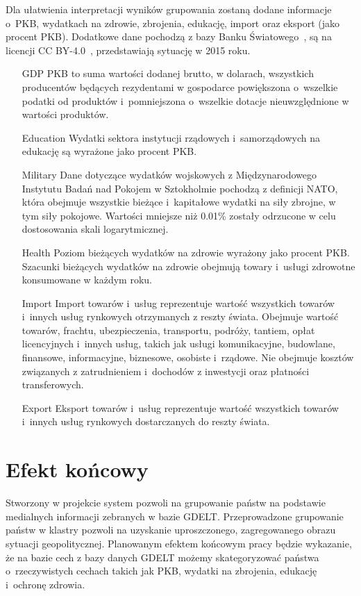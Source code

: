 \documentclass[11pt]{report}
\begin{document}
    Dla ułatwienia interpretacji wyników grupowania zostaną dodane informacje o~PKB, wydatkach na zdrowie, zbrojenia, edukację, import oraz eksport (jako procent PKB).
    Dodatkowe dane pochodzą z bazy Banku Światowego~\cite{worldbank}, są na licencji CC BY-4.0~\cite{wblicense}, przedstawiają sytuację w 2015 roku.
    \begin{enumerate}
        \item[GDP] PKB to suma wartości dodanej brutto, w dolarach, wszystkich producentów będących rezydentami w gospodarce powiększona o~wszelkie podatki od produktów i~pomniejszona o~wszelkie dotacje nieuwzględnione w wartości produktów.
        \item[Education] Wydatki sektora instytucji rządowych i~samorządowych na edukację są wyrażone jako procent PKB.
        \item[Military] Dane dotyczące wydatków wojskowych z Międzynarodowego Instytutu Badań nad Pokojem w Sztokholmie pochodzą z definicji NATO, która obejmuje wszystkie bieżące i~kapitałowe wydatki na siły zbrojne, w tym siły pokojowe.
        Wartości mniejsze niż 0.01\% zostały odrzucone w celu dostosowania skali logarytmicznej.
        \item[Health] Poziom bieżących wydatków na zdrowie wyrażony jako procent PKB. Szacunki bieżących wydatków na zdrowie obejmują towary i~usługi zdrowotne konsumowane w każdym roku.
        \item[Import] Import towarów i~usług reprezentuje wartość wszystkich towarów i~innych usług rynkowych otrzymanych z reszty świata.
        Obejmuje wartość towarów, frachtu, ubezpieczenia, transportu, podróży, tantiem, opłat licencyjnych i~innych usług, takich jak usługi komunikacyjne, budowlane, finansowe, informacyjne, biznesowe, osobiste i~rządowe.
        Nie obejmuje kosztów związanych z zatrudnieniem i~dochodów z inwestycji oraz płatności transferowych.
        \item[Export] Eksport towarów i~usług reprezentuje wartość wszystkich towarów i~innych usług rynkowych dostarczanych do reszty świata.
    \end{enumerate}


    \section{Efekt końcowy}\label{sec:efekt-końcowy}
    Stworzony w projekcie system pozwoli na grupowanie państw na podstawie medialnych informacji zebranych w bazie GDELT.
    Przeprowadzone grupowanie państw w klastry pozwoli na uzyskanie uproszczonego, zagregowanego obrazu sytuacji geopolitycznej.
    Planowanym efektem końcowym pracy będzie wykazanie, że na bazie cech z bazy danych GDELT możemy skategoryzować państwa o~rzeczywistych cechach takich jak PKB, wydatki na zbrojenia, edukację i~ochronę zdrowia.
\end{document}
